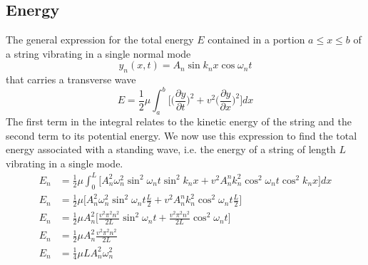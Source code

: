 \documentclass[../../../main.tex]{subfiles}
\begin{document}
\subsection{Energy}
The general expression for the total energy $E$ contained in a portion $a \leq x \leq b$ of a string vibrating in a single normal mode
\begin{equation*}
    y_n (x, t) = A_n \sin k_nx \cos \omega_nt
\end{equation*}
that carries a transverse wave
\begin{equation*}
    E=\frac{1}{2}\mu\int_{a}^{b}\biggl[ \biggl(\frac{\partial y}{\partial t}\biggr)^2 + v^2 \biggl(\frac{\partial y}{\partial x}\biggr)^2\biggr]dx
\end{equation*}
The ﬁrst term in the integral relates to the kinetic energy of the string and the second term to its potential energy. We now use this expression to ﬁnd the total energy associated with a standing wave, i.e. the energy of a string of length $L$ vibrating in a single mode.
\begin{align*}
    E_n&=\frac{1}{2}\mu\int_{0}^{L}\biggl[ A_n^2\omega_n^2\sin^2\omega_nt \sin^2k_nx + v^2 A_n^nk_n^2\cos^2\omega_n t\cos^2 k_nx\biggr]dx\\
    E_n&=\frac{1}{2}\mu\biggl[ A_n^2\omega_n^2\sin^2\omega_nt \frac{L}{2} + v^2 A_n^nk_n^2\cos^2\omega_nt \frac{L}{2}\biggr]\\
    E_n&=\frac{1}{2}\mu A_n^2\biggl[ \frac{v^2\pi^2 n^2}{2L}\sin^2\omega_nt  +  \frac{v^2\pi^2 n^2}{2L}\cos^2\omega_nt \biggr]\\
    E_n&=\frac{1}{2}\mu A_n^2\frac{v^2\pi^2 n^2}{2L}\\
    E_n&=\frac{1}{4}\mu LA_n^2\omega_n^2
\end{align*}
\end{document}
